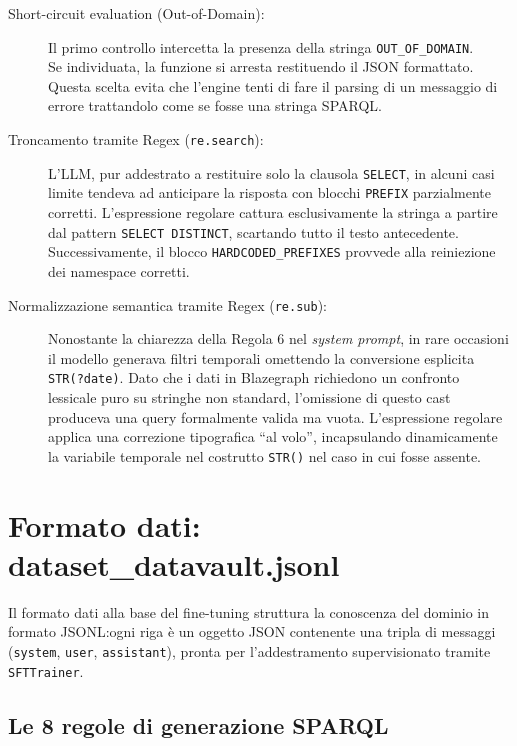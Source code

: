 \documentclass[12pt,a4paper,oneside]{book}
\newcommand{\code}[1]{\colorbox{light-gray}{\texttt{#1}}}
\begin{document}
\begin{description}
    \item[Short-circuit evaluation (Out-of-Domain):] Il primo controllo intercetta la presenza della stringa \code{OUT\_OF\_DOMAIN}.\\
    Se individuata, la funzione si arresta restituendo il JSON formattato.\\
    Questa scelta evita che l'engine tenti di fare il parsing di un messaggio di errore trattandolo come se fosse una stringa SPARQL.\@
    
    \item[Troncamento tramite Regex (\code{re.search}):] L'LLM, pur addestrato a restituire solo la clausola \code{SELECT}, in alcuni casi limite tendeva ad anticipare la risposta con blocchi \code{PREFIX} parzialmente corretti. L'espressione regolare cattura esclusivamente la stringa a partire dal pattern \code{SELECT DISTINCT}, scartando tutto il testo antecedente. Successivamente, il blocco \code{HARDCODED\_PREFIXES} provvede alla reiniezione dei namespace corretti.
    
    \item[Normalizzazione semantica tramite Regex (\code{re.sub}):] Nonostante la chiarezza della Regola 6 nel \textit{system prompt}, in rare occasioni il modello generava filtri temporali omettendo la conversione esplicita \code{STR(?date)}. Dato che i dati in Blazegraph richiedono un confronto lessicale puro su stringhe non standard, l'omissione di questo cast produceva una query formalmente valida ma vuota. L'espressione regolare applica una correzione tipografica ``al volo'', incapsulando dinamicamente la variabile temporale nel costrutto \code{STR()} nel caso in cui fosse assente. \end{description}

\newpage
\section{Formato dati: dataset\_datavault.jsonl}\label{sec:dataset}


Il formato dati alla base del fine-tuning struttura la conoscenza del dominio in formato JSONL:\@ ogni riga è un oggetto JSON contenente una tripla di messaggi (\code{system}, \code{user}, \code{assistant}), pronta per l'addestramento supervisionato tramite \code{SFTTrainer}.

\subsection{Le 8 regole di generazione SPARQL}\label{subsec:regole}
\end{document}
